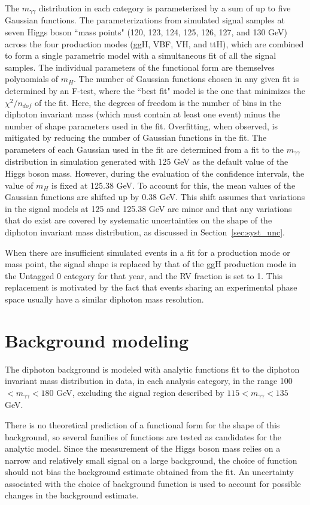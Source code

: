 The $m_{\gamma\gamma}$ distribution in each category is parameterized by a sum of up to five Gaussian functions. The parameterizations from simulated signal samples at seven Higgs boson ``mass points" (120, 123, 124, 125, 126, 127, and 130 GeV) across the four production modes (ggH, VBF, VH, and ttH), which are combined to form a single parametric model with a simultaneous fit of all the signal samples. The individual parameters of the functional form are themselves polynomials of $m_H$. The number of Gaussian functions chosen in any given fit is determined by an F-test, where the ``best fit" model is the one that minimizes the $\chi^2/n_{dof}$ of the fit. Here, the degrees of freedom is the number of bins in the diphoton invariant mass (which must contain at least one event) minus the number of shape parameters used in the fit. Overfitting, when observed, is mitigated by reducing the number of Gaussian functions in the fit. The parameters of each Gaussian used in the fit are determined from a fit to the $m_{\gamma\gamma}$ distribution in simulation generated with 125 GeV as the default value of the Higgs boson mass. However, during the evaluation of the confidence intervals, the value of $m_H$ is fixed at 125.38 GeV. To account for this, the mean values of the Gaussian functions are shifted up by 0.38 GeV. This shift assumes that variations in the signal models at 125 and 125.38 GeV are minor and that any variations that do exist are covered by systematic uncertainties on the shape of the diphoton invariant mass distribution, as discussed in Section~\ref{sec:syst_unc}. 

When there are insufficient simulated events in a fit for a production mode or mass point, the signal shape is replaced by that of the ggH production mode in the Untagged 0 category for that year, and the RV fraction is set to 1. This replacement is motivated by the fact that events sharing an experimental phase space usually have a similar diphoton mass resolution. 


\section{Background modeling}

The diphoton background is modeled with analytic functions fit to the diphoton invariant mass distribution in data, in each analysis category, in the range 100 $< m_{\gamma\gamma} < 180$ GeV, excluding the signal region described by $115 < m_{\gamma\gamma} < 135$ GeV. 

There is no theoretical prediction of a functional form for the shape of this background, so several families of functions are tested as candidates for the analytic model. Since the measurement of the Higgs boson mass relies on a narrow and relatively small signal on a large background, the choice of function should not bias the background estimate obtained from the fit. An uncertainty associated with the choice of background function is used to account for possible changes in the background estimate.

